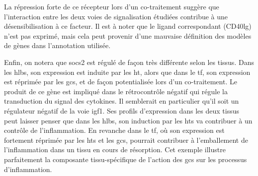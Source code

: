 \documentclass[../main.tex]{subfiles}
\begin{document}
La répression forte de ce récepteur lors d'un co-traitement suggère que l'interaction entre les deux voies de signalisation étudiées contribue à une désensibilisation à ce facteur.
Il est à noter que le ligand correspondant (CD40lg) n'est pas exprimé, mais cela peut provenir d'une mauvaise définition des modèles de gènes dans l'annotation utilisée.
\par
Enfin, on notera que \gls{socs2} est régulé de façon très différente selon les tissus.
Dans les \glspl{hlb}, son expression est induite par les \gls{ht}, alors que dans le \gls{tf}, son expression est réprimée par les \glspl{gc}, et de façon potentialisée lors d'un co-traitement.
Le produit de ce gène est impliqué dans le rétrocontrôle négatif qui régule la transduction du signal des cytokines.
Il semblerait en particulier qu'il soit un régulateur négatif de la voie \gls{igf}1.
Ses profils d'expression dans les deux tissus peut laisser penser que dans les \glspl{hlb}, son induction par les \glspl{ht} va contribuer à un contrôle de l'inflammation.
En revanche dans le \gls{tf}, où son expression est fortement réprimée par les \glspl{ht} et les \glspl{gc}, pourrait contribuer à l'emballement de l'inflammation dans un tissu en cours de résorption.
Cet exemple illustre parfaitement la composante tissu-spécifique de l'action des \glspl{gc} sur les processus d'inflammation.
\end{document}
